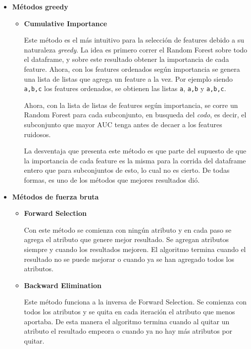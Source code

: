 \documentclass[a4paper]{article}
\begin{document}
\begin {itemize}

\item \textbf{Métodos greedy}

\begin {itemize}

	\item \textbf{Cumulative Importance}

	Este método es el más intuitivo para la selección de features debido a su naturaleza \textit{greedy}. La idea es primero correr el Random Forest sobre todo el dataframe, y sobre este resultado obtener la importancia de cada feature. Ahora, con los features ordenados según importancia se genera una lista de listas que agrega un feature a la vez. Por ejemplo siendo \texttt{a,b,c} los features ordenados, se obtienen las listas \texttt{a}, \texttt{a,b} y  \texttt{a,b,c}.

	Ahora, con la lista de listas de features según importancia, se corre un Random Forest para cada subconjunto, en busqueda del \textit{codo}, es decir, el subconjunto que mayor AUC tenga antes de decaer a los features ruidosos.

	La desventaja que presenta este método es que parte del supuesto de que la importancia de cada feature es la misma para la corrida del dataframe entero que para subconjuntos de esto, lo cual no es cierto. De todas formas, es uno de los métodos que mejores resultados dió.

\end{itemize}

\item \textbf{Métodos de fuerza bruta}

\begin{itemize}

	\item \textbf{Forward Selection}

	Con este método se comienza con ningún atributo y en cada paso se agrega el atributo que genere mejor resultado. Se agregan atributos siempre y cuando los resultados mejoren. El algoritmo termina cuando el resultado no se puede mejorar o cuando ya se han agregado todos los atributos.

	\item \textbf{Backward Elimination}

	Este método funciona a la inversa de Forward Selection. Se comienza con todos los atributos y se quita en cada iteración el atributo que menos aportaba. De esta manera el algoritmo termina cuando al quitar un atributo el resultado empeora o cuando ya no hay más atributos por quitar.


\end{itemize}
\end{itemize}
\end{document}
